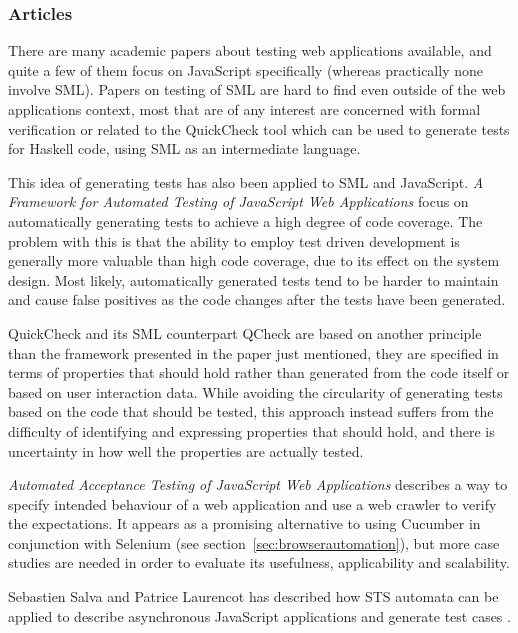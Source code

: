 \documentclass[11pt]{article}
\begin{document}
\subsubsection{Articles}

There are many academic papers about testing web applications available, and quite a few of them focus on JavaScript specifically (whereas practically none involve SML). Papers on testing of SML are hard to find even outside of the web applications context, most that are of any interest are concerned with formal verification or related to the QuickCheck tool which can be used to generate tests for Haskell code, using SML as an intermediate language.

This idea of generating tests has also been applied to SML and JavaScript. \emph{A Framework for Automated Testing of JavaScript Web Applications} \cite{AutomatedTesting} focus on automatically generating tests to achieve a high degree of code coverage. The problem with this is that the ability to employ test driven development is generally more valuable than high code coverage, due to its effect on the system design. Most likely, automatically generated tests tend to be harder to maintain and cause false positives as the code changes after the tests have been generated.

QuickCheck and its SML counterpart QCheck are based on another principle than the framework presented in the paper just mentioned, they are specified in terms of properties that should hold rather than generated from the code itself or based on user interaction data. While avoiding the circularity of generating tests based on the code that should be tested, this approach instead suffers from the difficulty of identifying and expressing properties that should hold, and there is uncertainty in how well the properties are actually tested.

\emph{Automated Acceptance Testing of JavaScript Web Applications} \cite{AutomatedAcceptance} describes a way to specify intended behaviour of a web application and use a web crawler to verify the expectations. It appears as a promising alternative to using Cucumber in conjunction with Selenium (see section~\ref{sec:browserautomation}), but more case studies are needed in order to evaluate its usefulness, applicability and scalability. %

Sebastien Salva and Patrice Laurencot has described how STS automata can be applied to describe asynchronous JavaScript applications and generate test cases \cite{AutomatedAjax}.
\end{document}
